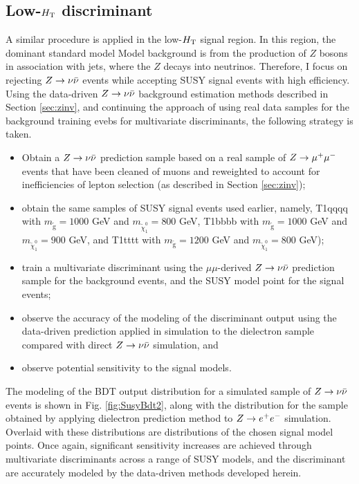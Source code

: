 \FloatBarrier
\subsection{Low-$H_{\rm T}$ discriminant}
A similar procedure is applied in the low-$H_{\rm T}$ signal region. In this region, the dominant standard model Model background is from the production of $Z$ bosons in association with jets, where the $Z$ decays into neutrinos. Therefore, I focus on rejecting $Z\rightarrow \nu\bar{\nu}$ events while accepting SUSY signal events with high efficiency. Using the data-driven $Z\rightarrow \nu\bar{\nu}$ background estimation methods described in Section \ref{sec:zinv}, and continuing the approach of using real data samples for the background training evebs for multivariate discriminants, the following strategy is taken.
\begin{itemize}
\item Obtain a $Z\rightarrow \nu\bar{\nu}$ prediction sample based on a real sample of $Z\rightarrow \mu^+\mu^-$ events that have been cleaned of muons and reweighted to account for inefficiencies of lepton selection (as described in Section \ref{sec:zinv});
\item obtain the same samples of SUSY signal events used earlier, namely, T1qqqq with $m_{\tilde{\text{g}}}=1000$ GeV and $m_{\tilde{\chi}^{0}_{1}}=800$ GeV,  T1bbbb with $m_{\tilde{\text{g}}}=1000$ GeV and $m_{\tilde{\chi}^{0}_{1}}=900$ GeV, and T1tttt with $m_{\tilde{\text{g}}}=1200$ GeV and $m_{\tilde{\chi}^{0}_{1}}=800$ GeV);
\item train a multivariate discriminant using the $\mu\mu$-derived $Z\rightarrow \nu\bar{\nu}$ prediction sample for the background events, and the  SUSY model point for the signal events;
\item observe the accuracy of the modeling of the discriminant output using the data-driven prediction applied in simulation to the dielectron sample compared with direct $Z\rightarrow \nu\bar{\nu}$ simulation, and
\item observe potential sensitivity to the signal models.
\end{itemize}
The modeling of the BDT output distribution for a simulated sample of $Z\rightarrow \nu\bar{\nu}$ events is shown in Fig. \ref{fig:SusyBdt2}, along with the distribution for the sample obtained by applying dielectron prediction method to $Z\rightarrow e^+e^-$ simulation. Overlaid with these distributions are distributions of the chosen signal model points. Once again, significant sensitivity increases are achieved through multivariate discriminants across a range of SUSY models, and the discriminant are accurately modeled by the data-driven methods developed herein. 
